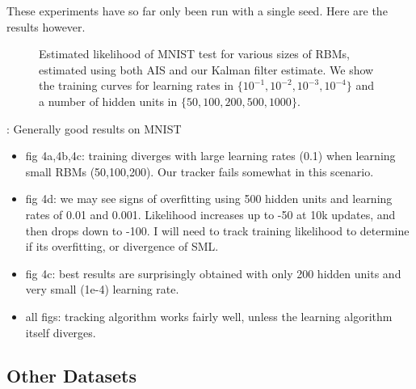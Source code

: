 \documentclass[runningheads,a4paper]{llncs}
\begin{document}
\bigskip

These experiments have so far only been run with a single seed. Here are the results however.

\begin{figure}[!htb]
    \centering
    \hspace{-1cm}
    \hspace{-1cm}
\caption{Estimated likelihood of MNIST test for various sizes of RBMs,
estimated using both AIS and our Kalman filter estimate. We show the training
curves for learning rates in $\{ 10^{-1},10^{-2},10^{-3},10^{-4} \}$ and
a number of hidden units in $\{50,100,200,500,1000\}$.}
\end{figure}

\bigskip
{}: Generally good results on MNIST
\begin{itemize}
    \item fig 4a,4b,4c: training diverges with large learning rates (0.1) when
          learning small RBMs (50,100,200). Our tracker fails somewhat in this scenario.
    \item fig 4d: we may see signs of overfitting using 500 hidden units and
          learning rates of 0.01 and 0.001. Likelihood increases up to -50 at 10k
          updates, and then drops down to -100. I will need to track training likelihood
          to determine if its overfitting, or divergence of SML.
    \item fig 4c: best results are surprisingly obtained with only 200 hidden
          units and very small (1e-4) learning rate.
    \item all figs: tracking algorithm works fairly well, unless the learning
          algorithm itself diverges.
\end{itemize}

\clearpage

\subsection{Other Datasets}
\end{document}
